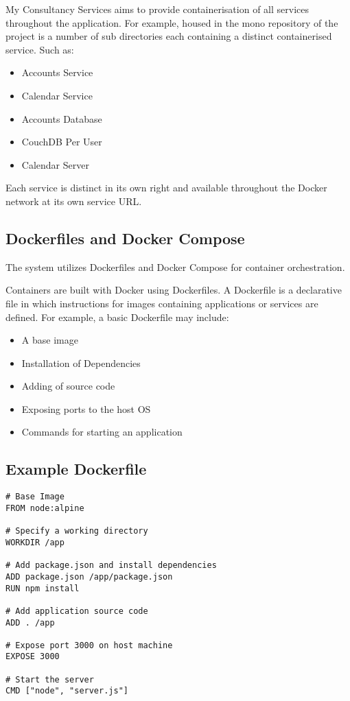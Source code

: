 My Consultancy Services aims to provide containerisation of all services throughout the application. For example, housed in the mono repository of the project is a number of sub directories each containing a distinct containerised service. Such as:

\begin{itemize}
\item{Accounts Service}
\item{Calendar Service}
\item{Accounts Database}
\item{CouchDB Per User}
\item{Calendar Server}
\end{itemize}


Each service is distinct in its own right and available throughout the Docker network at its own service URL.

\subsection{Dockerfiles and Docker Compose}

The system utilizes Dockerfiles and Docker Compose for container orchestration.

Containers are built with Docker using Dockerfiles\cite{dockerfile}. A Dockerfile is a declarative file in which instructions for images containing applications or services are defined. For example, a basic Dockerfile may include:

\begin{itemize}
\item
A base image

\item
Installation of Dependencies

\item
Adding of source code

\item
Exposing ports to the host OS

\item
Commands for starting an application
\end{itemize}

\subsection*{ Example Dockerfile }

\begin{verbatim}
# Base Image
FROM node:alpine

# Specify a working directory
WORKDIR /app

# Add package.json and install dependencies
ADD package.json /app/package.json
RUN npm install

# Add application source code
ADD . /app

# Expose port 3000 on host machine
EXPOSE 3000

# Start the server
CMD ["node", "server.js"]
\end{verbatim}

